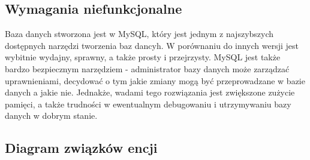\documentclass[12pt,a4paper]{article}
\begin{document}
\subsection{Wymagania niefunkcjonalne}
\label{sec:NonFunctionalConditions}

Baza danych stworzona jest w MySQL, który jest jednym z najszybszych dostępnych narzędzi tworzenia baz dancyh. W porównaniu do innych wersji jest wybitnie wydajny, sprawny, a także prosty i przejrzysty. MySQL jest także bardzo bezpiecznym narzędziem - administrator bazy danych może zarządzać uprawnieniami, decydować o tym jakie zmiany mogą być przeprowadzane w bazie danych a jakie nie.
\newline
\newline
Jednakże, wadami tego rozwiązania jest zwiększone zużycie pamięci, a także trudności w ewentualnym debugowaniu i utrzymywaniu bazy danych w dobrym stanie.

\subsection{Diagram związków encji}
\label{sec:ERD} 
\end{document}
